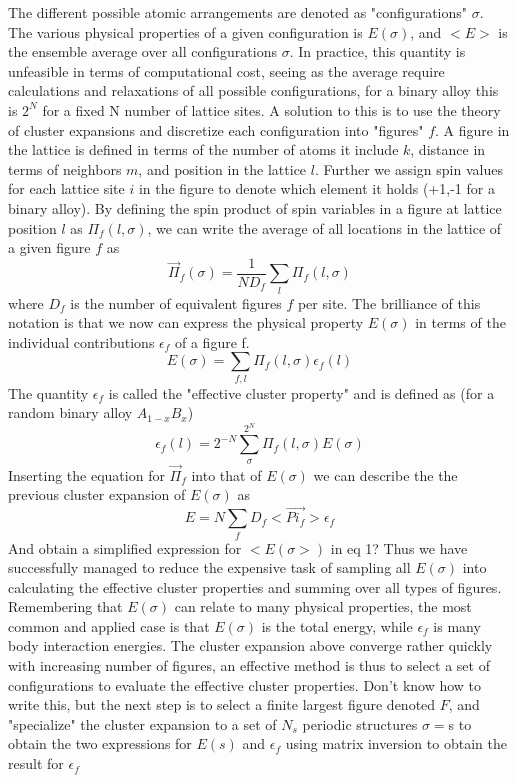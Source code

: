 The different possible atomic arrangements are denoted as "configurations" $\sigma$. The various physical properties of a given configuration is $E(\sigma)$, and $<E>$ is the ensemble average over all configurations $\sigma$. In practice, this quantity is unfeasible in terms of computational cost, seeing as the average require calculations and relaxations of all possible configurations, for a binary alloy this is $2^N$ for a fixed N number of lattice sites. A solution to this is to use the theory of cluster expansions and discretize each configuration into "figures" $f$. A figure in the lattice is defined in terms of the number of atoms it include $k$, distance in terms of neighbors $m$, and position in the lattice $l$. Further we assign spin values for each lattice site $i$ in the figure to denote which element it holds (+1,-1 for a binary alloy). By defining the spin product of spin variables in a figure at lattice position $l$ as $\Pi_f(l, \sigma)$, we can write the average of all locations in the lattice of a given figure $f$ as 
\begin{equation}
    \vec{\Pi}_f(\sigma) = \frac{1}{ND_f} \sum_l \Pi_f (l,\sigma)
\end{equation}
where $D_f$ is the number of equivalent figures $f$ per site. The brilliance of this notation is that we now can express the physical property $E(\sigma)$ in terms of the individual contributions $\epsilon_f$ of a figure f.
\begin{equation}
    E(\sigma) = \sum_{f,l} \Pi_f(l, \sigma) \epsilon_f(l)
\end{equation}
The quantity $\epsilon_f$ is called the "effective cluster property" and is defined as (for a random binary alloy $A_{1-x}B_x$)
\begin{equation}
    \epsilon_f(l) = 2^{-N}\sum_\sigma^{2^N} \Pi_f (l,\sigma) E(\sigma)
\end{equation}
Inserting the equation for $\vec{\Pi}_f$ into that of $E(\sigma)$ we can describe the the previous cluster expansion of $E(\sigma)$ as
\begin{equation}
    E = N\sum_f D_f<\vec{Pi_f}>\epsilon_f
\end{equation}
And obtain a simplified expression for $<E(\sigma>)$ in eq 1? Thus we have successfully managed to reduce the expensive task of sampling all $E(\sigma)$ into calculating the effective cluster properties and summing over all types of figures. Remembering that $E(\sigma)$ can relate to many physical properties, the most common and applied case is that $E(\sigma)$ is the total energy, while $\epsilon_f$ is many body interaction energies. The cluster expansion above converge rather quickly with increasing number of figures, an effective method is thus to select a set of configurations to evaluate the effective cluster properties. Don't know how to write this, but the next step is to select a finite largest figure denoted $F$, and "specialize" the cluster expansion to a set of $N_s$ periodic structures ${\sigma} = ${s} to obtain the two expressions for $E(s)$ and $\epsilon_f$ using matrix inversion to obtain the result for $\epsilon_f$
